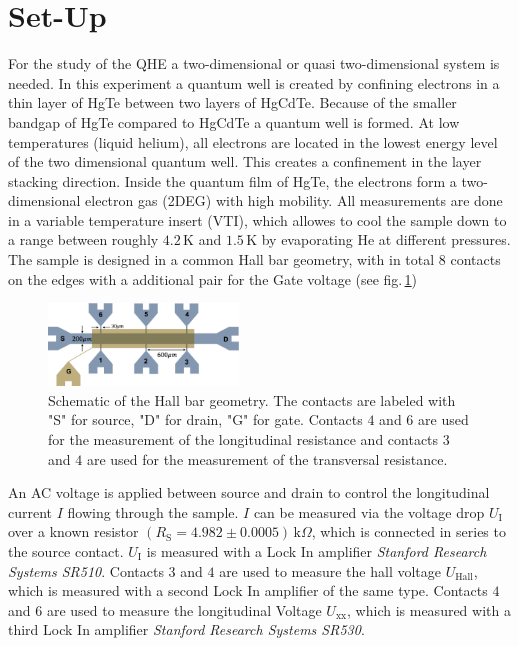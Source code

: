 \section{Set-Up}
For the study of the QHE a two-dimensional or quasi two-dimensional system is needed.
In this experiment a quantum well is created by confining electrons in a thin layer of HgTe between
two layers of HgCdTe. Because of the smaller bandgap of HgTe compared to HgCdTe a quantum well is formed. 
At low temperatures (liquid helium), all electrons are located in the lowest energy level of the 
two dimensional quantum well. This creates a confinement in the layer stacking direction.
Inside the quantum film of HgTe, the electrons form a two-dimensional electron gas (2DEG) with high mobility.
All measurements are done in a variable temperature insert (VTI), which allowes to cool the sample down to a
range between roughly $4.2\,\text{K}$ and $1.5\,\text{K}$ by evaporating He at different pressures. The sample is designed in a common Hall bar geometry,
with in total $8$ contacts on the edges with a additional pair for the Gate voltage (see fig.\,\ref{fig:HallBar})
\begin{figure}[h]
    \centering
    \includegraphics[width=0.45\textwidth]{../Images/HallBar.png}
    \caption{Schematic of the Hall bar geometry. The contacts are labeled with "S" for source, "D" for drain,
    "G" for gate. Contacts $4$ and $6$ are used for the measurement of the longitudinal resistance 
    and contacts $3$ and $4$ are used for the measurement of the transversal resistance.}
    \label{fig:HallBar}
\end{figure}
An AC voltage is applied between source and drain to control the longitudinal current $I$
flowing through the sample. $I$ can be measured via the voltage drop $U_\text{I}$ over a known resistor $(R_\text{S}=4.982\pm0.0005)\,\text{k}\Omega$, 
which is connected in series to the source contact. $U_\text{I}$ is measured with a Lock In amplifier 
\emph{Stanford Research Systems SR510}. Contacts $3$ and $4$ are used to measure the hall voltage $U_\text{Hall}$, which
is measured with a second Lock In amplifier of the same type. Contacts $4$ and $6$ are used to measure
the longitudinal Voltage $U_\text{xx}$, which is measured with a third Lock In amplifier \emph{Stanford Research Systems SR530}.
